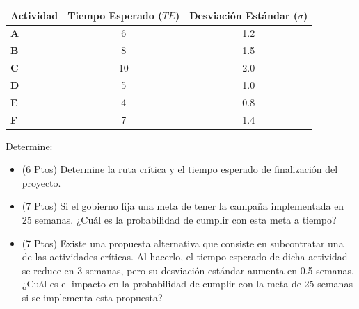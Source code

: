 \documentclass[11pt, a4paper]{article}
\begin{document}
  \begin{center}
  \small
  \begin{tabular}{lcc}
    \toprule
    \textbf{Actividad} & \textbf{Tiempo Esperado ($TE$)} & \textbf{Desviación Estándar ($\sigma$)} \\
    \midrule
    \textbf{A} & 6 & 1.2 \\
    \textbf{B} & 8 & 1.5 \\
    \textbf{C} & 10 & 2.0 \\
    \textbf{D} & 5 & 1.0 \\
    \textbf{E} & 4 & 0.8 \\
    \textbf{F} & 7 & 1.4 \\
    \bottomrule
  \end{tabular}
  \end{center}

  Determine:
  \begin{itemize}
    \item[\textbf{a)}] (6 Ptos) Determine la ruta crítica y el tiempo esperado de finalización del proyecto.
    \item[\textbf{b)}] (7 Ptos) Si el gobierno fija una meta de tener la campaña implementada en 25 semanas. ¿Cuál es la probabilidad de cumplir con esta meta a tiempo?
    \item[\textbf{c)}] (7 Ptos) Existe una propuesta alternativa que consiste en subcontratar una de las actividades críticas. Al hacerlo, el tiempo esperado de dicha actividad se reduce en 3 semanas, pero su desviación estándar aumenta en 0.5 semanas. ¿Cuál es el impacto en la probabilidad de cumplir con la meta de 25 semanas si se implementa esta propuesta?
  \end{itemize}
\end{document}

